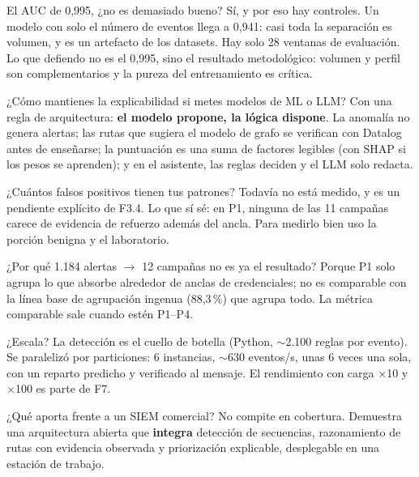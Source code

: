 \documentclass[11pt,a4paper]{article}
\newcommand{\flecha}{$\rightarrow$}
\begin{document}
\begin{pregunta}{El AUC de 0,995, ¿no es demasiado bueno?}
Sí, y por eso hay controles. Un modelo con solo el número de eventos llega a 0,941: casi toda la separación es
volumen, y es un artefacto de los datasets. Hay solo 28 ventanas de evaluación. Lo que defiendo no es el 0,995, sino
el resultado metodológico: volumen y perfil son complementarios y la pureza del entrenamiento es crítica.
\end{pregunta}

\begin{pregunta}{¿Cómo mantienes la explicabilidad si metes modelos de ML o LLM?}
Con una regla de arquitectura: \textbf{el modelo propone, la lógica dispone}. La anomalía no genera alertas; las
rutas que sugiera el modelo de grafo se verifican con Datalog antes de enseñarse; la puntuación es una suma de
factores legibles (con SHAP si los pesos se aprenden); y en el asistente, las reglas deciden y el LLM solo redacta.
\end{pregunta}

\begin{pregunta}{¿Cuántos falsos positivos tienen tus patrones?}
Todavía no está medido, y es un pendiente explícito de F3.4. Lo que sí sé: en P1, ninguna de las 11 campañas carece
de evidencia de refuerzo además del ancla. Para medirlo bien uso la porción benigna y el laboratorio.
\end{pregunta}

\begin{pregunta}{¿Por qué 1.184 alertas \flecha{} 12 campañas no es ya el resultado?}
Porque P1 solo agrupa lo que absorbe alrededor de anclas de credenciales; no es comparable con la línea base de
agrupación ingenua (88,3\,\%) que agrupa todo. La métrica comparable sale cuando estén P1–P4.
\end{pregunta}

\begin{pregunta}{¿Escala?}
La detección es el cuello de botella (Python, $\sim$2.100 reglas por evento). Se paralelizó por particiones: 6 instancias,
$\sim$630 eventos/s, unas 6 veces una sola, con un reparto predicho y verificado al mensaje. El rendimiento con carga
$\times$10 y $\times$100 es parte de F7.
\end{pregunta}

\begin{pregunta}{¿Qué aporta frente a un SIEM comercial?}
No compite en cobertura. Demuestra una arquitectura abierta que \textbf{integra} detección de secuencias, razonamiento
de rutas con evidencia observada y priorización explicable, desplegable en una estación de trabajo.
\end{pregunta}
\end{document}
